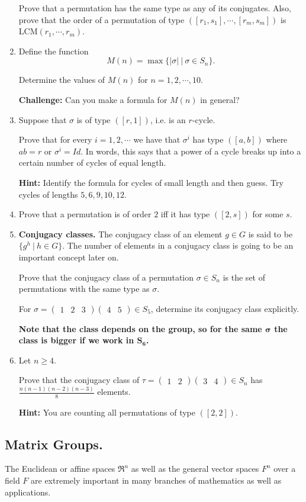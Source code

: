 \documentclass[12pt]{article}
\newcommand{\matr}[2]{\left( \begin{array}{*{#1}{r}}#2\end{array}\right)}
\begin{document}
\begin{enumerate}
Prove that a permutation has the same type as any of its conjugates.
Also, prove that the order of a permutation of type
$([r_1,s_1],\cdots,[r_m,s_m])$ is $\mbox{LCM}(r_1,\cdots,r_m)$.

\item Define the function 
$$M(n) = \max\{|\sigma| ~|~ \sigma\in S_n\}.$$

Determine the values of $M(n)$ for $n=1,2,\cdots,10$.

{\bf Challenge:} Can you make a formula for $M(n)$ in general?

\item Suppose that $\sigma$ is of type $([r,1])$, i.e. is an $r$-cycle.

Prove that for every $i=1,2,\cdots$ we have that $\sigma^i$ has type
$([a,b])$ where $ab=r$ or $\sigma^i=Id$. 
In words, this says that a power of a cycle
breaks up into a certain number of cycles of equal length.

{\bf Hint:} Identify the formula for cycles of small length and then
guess. Try cycles of lengths $5,6,9,10,12$.

\item Prove that a permutation is of order $2$ iff it has type $([2,s])$
for some $s$.

\item {\bf Conjugacy classes.}
The conjugacy class of an element $g\in G$ is said to be 
$\{g^h ~|~ h \in G\}$.
The number of elements in a conjugacy class is going to be an important
concept later on.

Prove that the conjugacy class of a permutation
$\sigma\in S_n$ is the set of permutations with the same type as
$\sigma$.

For $\sigma = \matr{3}{1 & 2 & 3} \matr{2}{4 & 5} \in S_5$, 
determine its conjugacy class explicitly. 

{\bf Note that the class depends on the group, so for the same 
$\mathbf{\sigma}$ 
the class is bigger if we work in $\mathbf{S_6}$.}

\item Let $n\geq 4$.

Prove that the conjugacy class of 
$\tau = \matr{2}{1 & 2} \matr{2}{3 & 4}\in S_n$
has $\frac{n(n-1)(n-2)(n-3)}{8}$ elements.

{\bf Hint:} You are counting all permutations of type $([2,2])$. 


\end{enumerate}

\subsection{Matrix Groups.}
The Euclidean or affine spaces $\Re^n$ as well as the general vector
spaces $F^n$ over a field $F$ are extremely important in many branches
of mathematics as well as applications.
\end{document}

